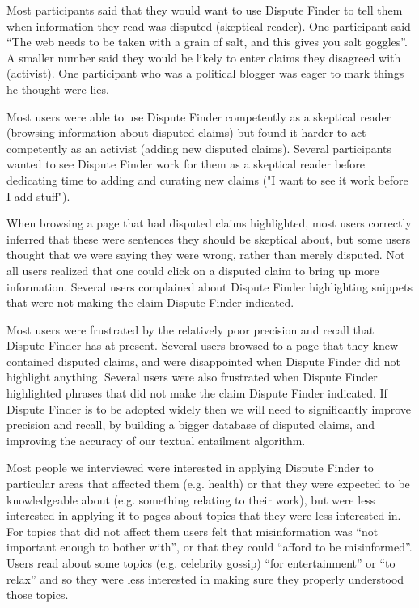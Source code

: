 \documentclass{www2010-submission}
\newcommand{\todo}[1]{}
\begin{document}
\todo{Tye: say how many were keen to use the tool.}

Most participants said that they would want to use Dispute Finder to tell them when information they read was disputed (skeptical reader). One participant said ``The web needs to be taken with a grain of salt, and this gives you salt goggles''. A smaller number said they would be likely to enter claims they disagreed with (activist). One participant who was a political blogger was eager to mark things he thought were lies.

Most users were able to use Dispute Finder competently as a skeptical reader (browsing information about disputed claims) but found it harder to act competently as an activist (adding new disputed claims). Several participants wanted to see Dispute Finder work for them as a skeptical reader before dedicating time to adding and curating new claims ("I want to see it work before I add stuff").

When browsing a page that had disputed claims highlighted, most users correctly inferred that these were sentences they should be skeptical about, but some users thought that we were saying they were wrong, rather than merely disputed. Not all users realized that one could click on a disputed claim to bring up more information. Several users complained about Dispute Finder highlighting snippets that were not making the claim Dispute Finder indicated.

Most users were frustrated by the relatively poor precision and recall that Dispute Finder has at present. Several users browsed to a page that they knew contained disputed claims, and were disappointed when Dispute Finder did not highlight anything. Several users were also frustrated when Dispute Finder highlighted phrases that did not make the claim Dispute Finder indicated. If Dispute Finder is to be adopted widely then we will need to significantly improve precision and recall, by building a bigger database of disputed claims, and improving the accuracy of our textual entailment algorithm.

Most people we interviewed were interested in applying Dispute Finder to particular areas that affected them (e.g. health) or that they were expected to be knowledgeable about (e.g. something relating to their work), but were less interested in applying it to pages about topics that they were less interested in. For topics that did not affect them users felt that misinformation was ``not important enough to bother with'', or that they could ``afford to be misinformed''. Users read about some topics (e.g. celebrity gossip) ``for entertainment'' or ``to relax'' and so they were less interested in making sure they properly understood those topics.
\end{document}
